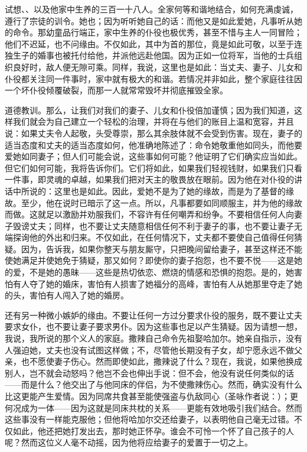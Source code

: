 试想、、以及他家中生养的三百一十八人。全家何等和谐地结合，如何充满虔诚，遵行了宗徒的训令。她也；因为听听她自己的话：而他又是如此爱她，凡事听从她的命令。那幼童品行端正，家中生养的仆役也极优秀，甚至不惜与主人一同冒险；他们不迟延，也不问缘由。不仅如此，其中为首的那位，竟是如此可敬，以至于连独生子的婚事也被托付给他，并派他远赴他国。因为正如一位将军，当他的士兵组织良好时，敌人便无隙可乘。同样，我说，这里也是如此：当丈夫、妻子、儿女和仆役都关注同一件事时，家中就有极大的和谐。若情况并非如此，整个家庭往往因一个坏仆役倾覆破裂，而那一人就常常毁坏并彻底摧毁全家。\par

道德教训。那么，让我们对我们的妻子、儿女和仆役倍加谨慎；因为我们知道，这样我们就会为自己建立一个轻松的治理，并将在与他们的账目上温和宽容，并且说：如果丈夫令人起敬，头受尊崇，那么其余肢体就不会受到伤害。现在，妻子的适当态度和丈夫的适当态度如何，他准确地陈述了：命令她敬重他如同头，而他要爱她如同妻子；但人们可能会说，这些事如何可能？他证明了它们确实应当如此。但它们如何可能，我将告诉你们。它们将如此，如果我们轻视钱财，如果我们只看一件事，即灵魂的卓越，如果我们把对天主的敬畏放在眼前。因为他在对仆役的讲话中所说的：这里也是如此。因此，爱她不是为了她的缘故，而是为了基督的缘故。至少，他在说时已暗示了这一点。所以，凡事都要如同顺服主，并为他的缘故而做。这就足以激励并劝服我们，不容许有任何嘲弄和纷争。不要相信任何人向妻子毁谤丈夫；同样，也不要让丈夫随意相信任何不利于妻子的事，也不要让妻子无端探询他的外出和归来。不仅如此，在任何情况下，丈夫都不要使自己值得任何猜疑。因为，告诉我，如果你整天与朋友厮守，只把晚间留给妻子，甚至这样还不能使她满足并使她免于猜疑，那又如何？即使你的妻子抱怨，也不要不悦——这是她的爱，不是她的愚昧——这些是热切依恋、燃烧的情感和恐惧的抱怨。是的，她害怕有人夺了她的婚床，害怕有人损害了她福分的高峰，害怕有人从她那里夺走了她的头，害怕有人闯入了她的婚房。\par

还有另一种微小嫉妒的缘由。不要让任何一方过分要求仆役的服务，既不要让丈夫要求女仆，也不要让妻子要求男仆。因为这些事也足以产生猜疑。因为请想一想，我说，我所说的那个义人的家庭。撒辣自己命令先祖娶哈加尔。她亲自指示，没有人强迫她，丈夫也没有试图这样做；不，尽管他长期没有子女，却宁愿永远不做父亲，也不愿使妻子伤心。然而即使如此，撒辣说了什么？现在，我说，如果他换成别人，岂不就会动怒吗？他岂不会也伸出手说：但不会，他没有说任何类似的话——而是什么？他交出了与他同床的伴侣，为不使撒辣伤心。然而，确实没有什么比这更能产生爱情。因为同席共食甚至能使强盗与仇敌同心（圣咏作者说：）；更何况成为一体——因为这就是同床共枕的关系——更能有效地吸引我们结合。然而这些事没有一样能克服他；但他将哈加尔交还给妻子，以表明他自己毫无过错。不仅如此，他还把她打发出去，那时她正怀孕。谁会不可怜一个怀了自己孩子的人呢？然而这位义人毫不动摇，因为他将应给妻子的爱置于一切之上。\par


